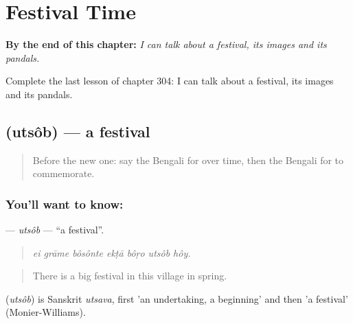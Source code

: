 
\chapter{Festival Time}
\label{ch:bn-festival-time}

\begin{chapteropening}
\textbf{By the end of this chapter:} \emph{I can talk about a festival, its images and its pandals.}

Complete the last lesson of chapter 304: I can talk about a festival, its images and its pandals.
\end{chapteropening}

\section[\texorpdfstring{\bn{উৎসব} (utsôb)}{উৎসব (utsôb)}]{ (utsôb) — a festival}

\label{lesson:BN-C304-utsob}



\begin{quote}
Before the new one: say the Bengali for over time, then the Bengali for to commemorate.
\end{quote}

\subsection*{You'll want to know: }
\textbf{} — \emph{utsôb} — \textquotedblleft{}a festival\textquotedblright{}.

\begin{quote}
      
\end{quote}

\begin{quote}
\emph{ei grāme bôsônte ekṭā bôṛo utsôb hôy.}
\end{quote}

\begin{quote}
There is a big festival in this village in spring.
\end{quote}

\begin{cousinweb}
\textbf{} (\emph{utsôb}) is Sanskrit \emph{utsava}, first 'an undertaking, a beginning' and then 'a festival' (Monier-Williams).
\end{cousinweb}

